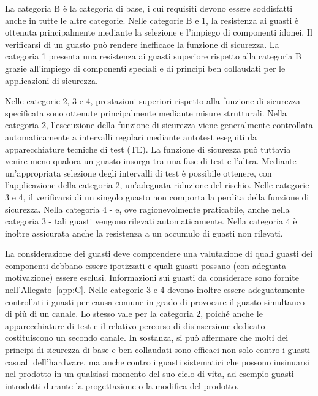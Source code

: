 La categoria B è la categoria di base, i cui requisiti devono essere soddisfatti anche in tutte le altre categorie. Nelle categorie B e 1, la resistenza ai guasti è ottenuta principalmente mediante la selezione e l'impiego di componenti idonei. Il verificarsi di un guasto può rendere inefficace la funzione di sicurezza. La categoria 1 presenta una resistenza ai guasti superiore rispetto alla categoria B grazie all'impiego di componenti speciali e di principi ben collaudati per le applicazioni di sicurezza.

Nelle categorie 2, 3 e 4, prestazioni superiori rispetto alla funzione di sicurezza specificata sono ottenute principalmente mediante misure strutturali. Nella categoria 2, l'esecuzione della funzione di sicurezza viene generalmente controllata automaticamente a intervalli regolari mediante autotest eseguiti da apparecchiature tecniche di test (TE). La funzione di sicurezza può tuttavia venire meno qualora un guasto insorga tra una fase di test e l'altra. Mediante un'appropriata selezione degli intervalli di test è possibile ottenere, con l'applicazione della categoria 2, un'adeguata riduzione del rischio. Nelle categorie 3 e 4, il verificarsi di un singolo guasto non comporta la perdita della funzione di sicurezza. Nella categoria 4 - e, ove ragionevolmente praticabile, anche nella categoria 3 - tali guasti vengono rilevati automaticamente. Nella categoria 4 è inoltre assicurata anche la resistenza a un accumulo di guasti non rilevati.

La considerazione dei guasti deve comprendere una valutazione di quali guasti dei componenti debbano essere ipotizzati e quali guasti possano (con adeguata motivazione) essere esclusi. Informazioni sui guasti da considerare sono fornite nell'Allegato~\ref{app:C}.
Nelle categorie 3 e 4 devono inoltre essere adeguatamente controllati i guasti per causa comune in grado di provocare il guasto simultaneo di più di un canale. Lo stesso vale per la categoria 2, poiché anche le apparecchiature di test e il relativo percorso di disinserzione dedicato costituiscono un secondo canale. In sostanza, si può affermare che molti dei principi di sicurezza di base e ben collaudati sono efficaci non solo contro i guasti casuali dell'hardware, ma anche contro i guasti sistematici che possono insinuarsi nel prodotto in un qualsiasi momento del suo ciclo di vita, ad esempio guasti introdotti durante la progettazione o la modifica del prodotto.


